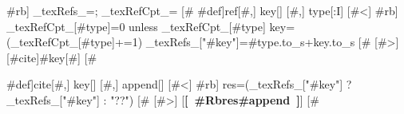 {#rb] _texRefs_={}; _texRefCpt_={} [#}
{#def]ref[#,] key[] [#,] type[:I] [#<]
{#rb]
_texRefCpt_[#{type}]=0 unless _texRefCpt_[#{type}]
key=(_texRefCpt_[#{type}]+=1)
_texRefs_["#{key}"]=#{type}.to_s+key.to_s
[#}
[#>] [{#cite]#{key}[#}]
[#}

{#def]cite[#,] key[] [#,] append[] [#<]
{#rb]
res=(_texRefs_["#{key}"] ? _texRefs_["#{key}"] : "??")
[#}
[#>] [\textbf{[~#Rb{res}#{append}~]}]
[#}
